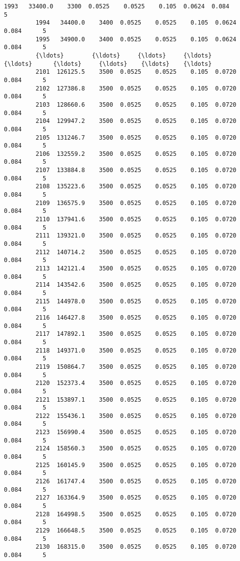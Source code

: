 \documentclass[11pt]{article}
\begin{document}
\begin{Verbatim}[commandchars=\\\{\}]
         1993   33400.0    3300  0.0525    0.0525    0.105  0.0624  0.084      5   
         1994   34400.0    3400  0.0525    0.0525    0.105  0.0624  0.084      5   
         1995   34900.0    3400  0.0525    0.0525    0.105  0.0624  0.084      5   
         {\ldots}        {\ldots}     {\ldots}     {\ldots}       {\ldots}      {\ldots}     {\ldots}    {\ldots}    {\ldots}   
         2101  126125.5    3500  0.0525    0.0525    0.105  0.0720  0.084      5   
         2102  127386.8    3500  0.0525    0.0525    0.105  0.0720  0.084      5   
         2103  128660.6    3500  0.0525    0.0525    0.105  0.0720  0.084      5   
         2104  129947.2    3500  0.0525    0.0525    0.105  0.0720  0.084      5   
         2105  131246.7    3500  0.0525    0.0525    0.105  0.0720  0.084      5   
         2106  132559.2    3500  0.0525    0.0525    0.105  0.0720  0.084      5   
         2107  133884.8    3500  0.0525    0.0525    0.105  0.0720  0.084      5   
         2108  135223.6    3500  0.0525    0.0525    0.105  0.0720  0.084      5   
         2109  136575.9    3500  0.0525    0.0525    0.105  0.0720  0.084      5   
         2110  137941.6    3500  0.0525    0.0525    0.105  0.0720  0.084      5   
         2111  139321.0    3500  0.0525    0.0525    0.105  0.0720  0.084      5   
         2112  140714.2    3500  0.0525    0.0525    0.105  0.0720  0.084      5   
         2113  142121.4    3500  0.0525    0.0525    0.105  0.0720  0.084      5   
         2114  143542.6    3500  0.0525    0.0525    0.105  0.0720  0.084      5   
         2115  144978.0    3500  0.0525    0.0525    0.105  0.0720  0.084      5   
         2116  146427.8    3500  0.0525    0.0525    0.105  0.0720  0.084      5   
         2117  147892.1    3500  0.0525    0.0525    0.105  0.0720  0.084      5   
         2118  149371.0    3500  0.0525    0.0525    0.105  0.0720  0.084      5   
         2119  150864.7    3500  0.0525    0.0525    0.105  0.0720  0.084      5   
         2120  152373.4    3500  0.0525    0.0525    0.105  0.0720  0.084      5   
         2121  153897.1    3500  0.0525    0.0525    0.105  0.0720  0.084      5   
         2122  155436.1    3500  0.0525    0.0525    0.105  0.0720  0.084      5   
         2123  156990.4    3500  0.0525    0.0525    0.105  0.0720  0.084      5   
         2124  158560.3    3500  0.0525    0.0525    0.105  0.0720  0.084      5   
         2125  160145.9    3500  0.0525    0.0525    0.105  0.0720  0.084      5   
         2126  161747.4    3500  0.0525    0.0525    0.105  0.0720  0.084      5   
         2127  163364.9    3500  0.0525    0.0525    0.105  0.0720  0.084      5   
         2128  164998.5    3500  0.0525    0.0525    0.105  0.0720  0.084      5   
         2129  166648.5    3500  0.0525    0.0525    0.105  0.0720  0.084      5   
         2130  168315.0    3500  0.0525    0.0525    0.105  0.0720  0.084      5   
         

\end{Verbatim}
\end{document}
